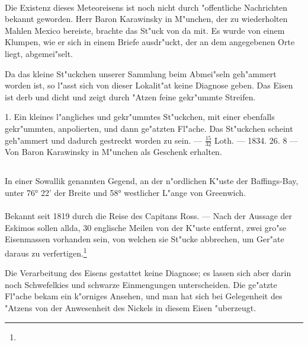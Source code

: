 \documentclass[a4paper, 11pt, oneside, polutonikogreek, german]{article}
\begin{document}
\paragraph{}
Die Existenz dieses Meteoreisens ist noch nicht durch "offentliche Nachrichten bekannt geworden. Herr Baron Karawinsky in M"unchen, der zu wiederholten Mahlen Mexico bereiste, brachte das St"uck von da mit. Es wurde von einem Klumpen, wie er sich in einem Briefe ausdr"uckt, der an dem angegebenen Orte liegt, abgemei"selt.

Da das kleine St"uckchen unserer Sammlung beim Abmei"seln geh"ammert worden ist, so l"asst sich von dieser Lokalit"at keine Diagnose geben. Das Eisen ist derb und dicht und zeigt durch "Atzen feine gekr"ummte Streifen.

1. Ein kleines l"angliches und gekr"ummtes St"uckchen, mit einer ebenfalls gekr"ummten, anpolierten, und dann ge"atzten Fl"ache. Das St"uckchen scheint geh"ammert und dadurch gestreckt worden zu sein. --- $\frac{15}{32}$ Loth. --- 1834. 26. 8 --- Von Baron Karawinsky in M"unchen als Geschenk erhalten.
\subsection{}
\begin{center}

In einer Sowallik genannten Gegend, an der n"ordlichen K"uste der Baffings-Bay, unter 76° 22' der Breite und 58° westlicher L"ange von Greenwich.
\end{center}
\paragraph{}
Bekannt seit 1819 durch die Reise des Capitans Ross. --- Nach der Aussage der Eskimos sollen allda, 30 englische Meilen von der K"uste entfernt, zwei gro"se Eisenmassen vorhanden sein, von welchen sie St"ucke abbrechen, um Ger"ate daraus zu verfertigen.\footnote{}

Die Verarbeitung des Eisens gestattet keine Diagnose; es lassen sich aber darin noch Schwefelkies und schwarze Einmengungen unterscheiden. Die ge"atzte Fl"ache bekam ein k"orniges Ansehen, und man hat sich bei Gelegenheit des "Atzens von der Anwesenheit des Nickels in diesem Eisen "uberzeugt.
\end{document}
